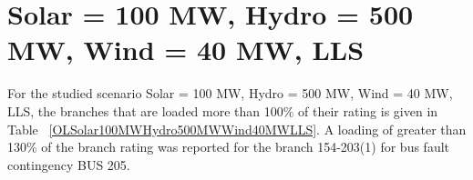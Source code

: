 \documentclass[10pt]{report}
\begin{document}
\section{Solar = 100 MW, Hydro = 500 MW, Wind = 40 MW, LLS}
For the studied scenario Solar = 100 MW, Hydro = 500 MW, Wind = 40 MW, LLS, the branches that are loaded more than 100\% of their rating is given in Table ~\ref{OLSolar100MWHydro500MWWind40MWLLS}. A loading of greater than 130\% of the branch rating was reported for the branch 154-203(1) for bus fault contingency BUS 205.
\begin{table}[H]
\caption{Contingencies causing branch flow greater than 100\% for scenario Solar = 100 MW, Hydro = 500 MW, Wind = 40 MW, LLS}
\label{OLSolar100MWHydro500MWWind40MWLLS}
\centering
{}
\end{table}
\end{document}
